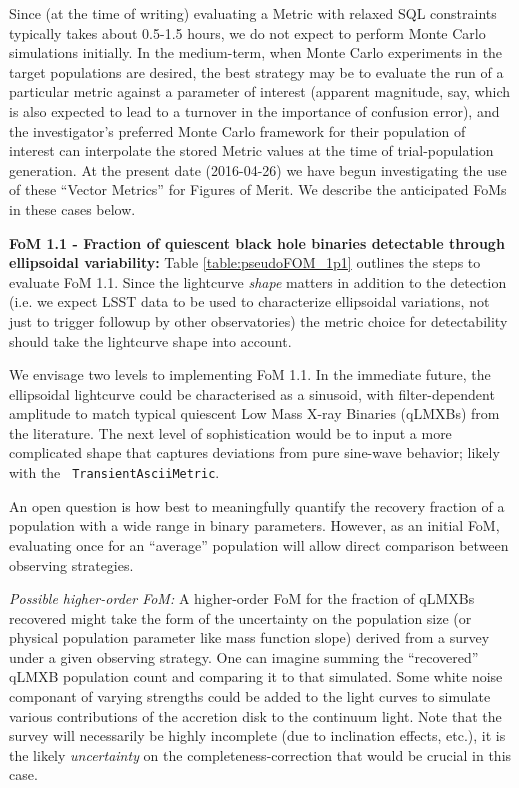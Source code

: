 Since (at the time of writing) evaluating a Metric with relaxed
  SQL constraints typically takes about 0.5-1.5 hours, we do not
  expect to perform Monte Carlo simulations initially. In the
  medium-term, when Monte Carlo experiments in the target populations
  are desired, the best strategy may be to evaluate the
  run of a particular metric against a parameter of interest (apparent
  magnitude, say, which is also expected to lead to a turnover in the
  importance of confusion error), and the investigator's preferred
  Monte Carlo framework for their population of interest can
  interpolate the stored Metric values at the time of trial-population
  generation. At the present date (2016-04-26) we have begun
  investigating the use of these ``Vector Metrics'' for Figures of
  Merit. We describe the anticipated FoMs in these cases below.

{\bf FoM 1.1 - Fraction of quiescent black hole binaries detectable
  through ellipsoidal variability:} Table
  \ref{table:pseudoFOM_1p1} outlines the steps to evaluate FoM
  1.1. Since the lightcurve {\it shape} matters in addition to the
  detection (i.e. we expect LSST data to be used to characterize
  ellipsoidal variations, not just to trigger followup by other
  observatories) the metric choice for detectability should take the
  lightcurve shape into account.

  We envisage two levels to implementing FoM 1.1. In the immediate
  future, the ellipsoidal lightcurve could be characterised as a
  sinusoid, with filter-dependent amplitude to match typical quiescent
  Low Mass X-ray Binaries (qLMXBs) from the literature. The next level
  of sophistication would be to input a more complicated shape that
  captures deviations from pure sine-wave behavior; likely with the {\tt
    TransientAsciiMetric}. 

An open question is how best to meaningfully quantify the
  recovery fraction of a population with a wide range in binary
  parameters. However, as an initial FoM, evaluating once for an
  ``average'' population will allow direct comparison between
  observing strategies.

{\it Possible higher-order FoM:} A higher-order FoM for the fraction
of qLMXBs recovered might take the form of the uncertainty on the
population size (or physical population parameter like mass function
slope) derived from a survey under a given observing strategy. One can
imagine summing the ``recovered'' qLMXB population count and comparing
it to that simulated. Some white noise componant of varying strengths
could be added to the light curves to simulate various contributions
of the accretion disk to the continuum light.  Note that the survey
will necessarily be highly incomplete (due to inclination effects,
etc.), it is the likely {\it uncertainty} on the
completeness-correction that would be crucial in this case.

